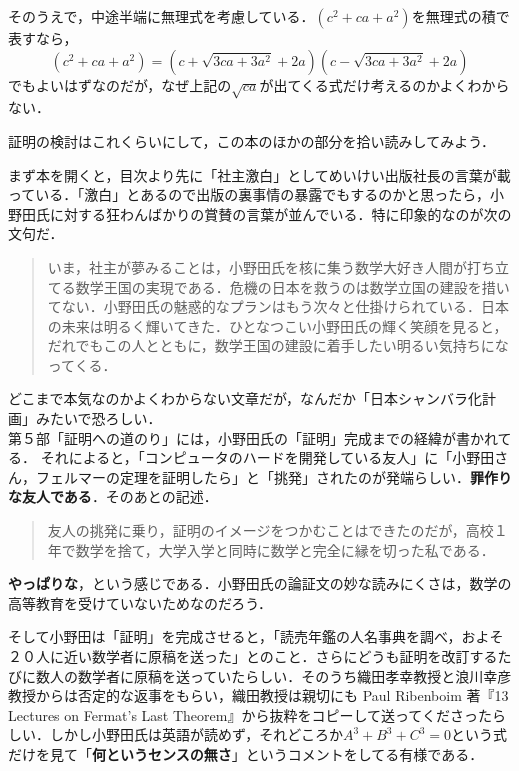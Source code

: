 そのうえで，中途半端に無理式を考慮している．$(c^2+ca+a^2)$を無理式の積で表すなら，
\[(c^2+ca+a^2)=(c+\sqrt{3ca+3a^2}+2a)(c-\sqrt{3ca+3a^2}+2a)\]
でもよいはずなのだが，なぜ上記の$\sqrt{ca}$が出てくる式だけ考えるのかよくわからない．


証明の検討はこれくらいにして，この本のほかの部分を拾い読みしてみよう．

まず本を開くと，目次より先に「社主激白」としてめいけい出版社長の言葉が載っている．「激白」とあるので出版の裏事情の暴露でもするのかと思ったら，小野田氏に対する狂わんばかりの賞賛の言葉が並んでいる．特に印象的なのが次の文句だ．

\begin{quote}
いま，社主が夢みることは，小野田氏を核に集う数学大好き人間が打ち立てる数学王国の実現である．危機の日本を救うのは数学立国の建設を措いてない．小野田氏の魅惑的なプランはもう次々と仕掛けられている．日本の未来は明るく輝いてきた．ひとなつこい小野田氏の輝く笑顔を見ると，だれでもこの人とともに，数学王国の建設に着手したい明るい気持ちになってくる．
\end{quote}

どこまで本気なのかよくわからない文章だが，なんだか「日本シャンバラ化計画」みたいで恐ろしい．\\

第５部「証明への道のり」には，小野田氏の「証明」完成までの経緯が書かれてる．
それによると，「コンピュータのハードを開発している友人」に「小野田さん，フェルマーの定理を証明したら」と「挑発」されたのが発端らしい．\textbf{罪作りな友人である}．そのあとの記述．

\begin{quote}
友人の挑発に乗り，証明のイメージをつかむことはできたのだが，高校１年で数学を捨て，大学入学と同時に数学と完全に縁を切った私である．
\end{quote}

\textbf{やっぱりな}，という感じである．小野田氏の論証文の妙な読みにくさは，数学の高等教育を受けていないためなのだろう．

そして小野田は「証明」を完成させると，「読売年鑑の人名事典を調べ，およそ２０人に近い数学者に原稿を送った」とのこと．さらにどうも証明を改訂するたびに数人の数学者に原稿を送っていたらしい．そのうち織田孝幸教授と浪川幸彦教授からは否定的な返事をもらい，織田教授は親切にも Paul Ribenboim 著『13 Lectures on Fermat's Last Theorem』から抜粋をコピーして送ってくださったらしい．しかし小野田氏は英語が読めず，それどころか$A^3+B^3+C^3=0$という式だけを見て「\textbf{何というセンスの無さ}」というコメントをしてる有様である．

